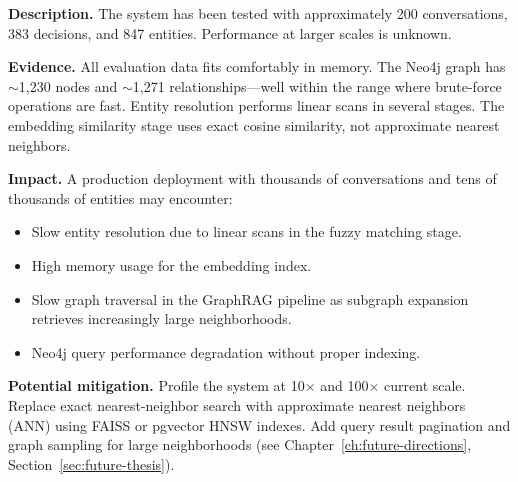 \noindent\textbf{Description.}
The system has been tested with approximately 200 conversations, 383
decisions, and 847 entities.  Performance at larger scales is unknown.

\medskip\noindent\textbf{Evidence.}
All evaluation data fits comfortably in memory.  The Neo4j graph has
$\sim$1,230 nodes and $\sim$1,271 relationships---well within the range
where brute-force operations are fast.  Entity resolution performs linear
scans in several stages.  The embedding similarity stage uses exact cosine
similarity, not approximate nearest neighbors.

\medskip\noindent\textbf{Impact.}
A production deployment with thousands of conversations and tens of
thousands of entities may encounter:

\begin{itemize}
    \item Slow entity resolution due to linear scans in the fuzzy matching
          stage.
    \item High memory usage for the embedding index.
    \item Slow graph traversal in the GraphRAG pipeline as subgraph
          expansion retrieves increasingly large neighborhoods.
    \item Neo4j query performance degradation without proper indexing.
\end{itemize}

\medskip\noindent\textbf{Potential mitigation.}
Profile the system at 10$\times$ and 100$\times$ current scale.  Replace
exact nearest-neighbor search with approximate nearest neighbors (ANN)
using FAISS or pgvector HNSW indexes.  Add query result pagination and
graph sampling for large neighborhoods (see
Chapter~\ref{ch:future-directions}, Section~\ref{sec:future-thesis}).
